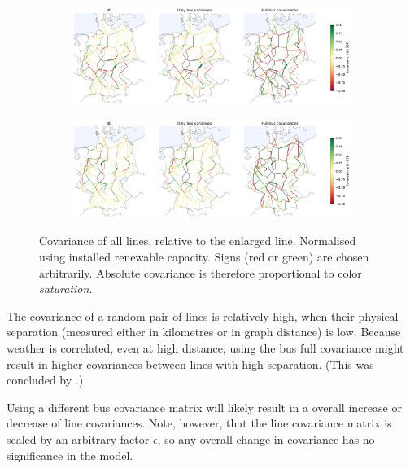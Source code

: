 \documentclass[main.tex]{subfiles}
\begin{document}
\begin{figure}[ht]
\begin{subfigure}{\textwidth}
    \centering
    \includegraphics[width=\textwidth]{img/flow_correlation_387_iid_and_justvar_and_fullcov.pdf}
    \caption{}\label{fig:linecov1}
\end{subfigure}
\begin{subfigure}{\textwidth}
    \centering
    \includegraphics[width=\textwidth]{img/flow_correlation_651_iid_and_justvar_and_fullcov.pdf}
    \caption{}\label{fig:linecov2}
\end{subfigure}
    \caption{Covariance of all lines, relative to the enlarged line. Normalised using installed renewable capacity. Signs (red or green) are chosen arbitrarily. Absolute covariance is therefore proportional to color \emph{saturation}.}
\end{figure}

The covariance of a random pair of lines is relatively high, when their physical separation (measured either in kilometres or in graph distance) is low. Because weather is correlated, even at high distance, using the bus full covariance might result in higher covariances between lines with high separation. (This was concluded by \cite{Nesti2018emergentfailures}.) 

Using a different bus covariance matrix will likely result in a overall increase or decrease of line covariances. Note, however, that the line covariance matrix is scaled by an arbitrary factor $\epsilon$, so any overall change in covariance has no significance in the model. 
\end{document}
